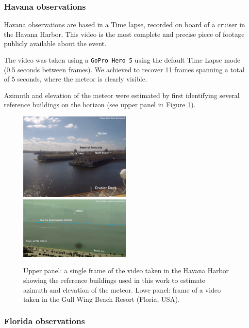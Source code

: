\documentclass[fleqn,usenatbib]{mnras}
\begin{document}
\subsubsection{Havana observations}
\label{sec:havana_observations}

Havana observations are based in a Time lapse, recorded on board of a cruiser in the Havana Harbor.  This video is the most complete and precise piece of footage publicly available about the event.  

The video was taken using a {\tt GoPro Hero 5} using the default Time Lapse mode (0.5 seconds between frames). We achieved to recover 11 frames spanning a total of 5 seconds, where the meteor is clearly visible.  

Azimuth and elevation of the meteor were estimated by first identifying several reference buildings on the horizon (see upper panel in Figure \ref{fig:havana_florida}).

\begin{figure}  
  \centering
  \includegraphics[width=0.50\textwidth]{picture-havana-vp.png}\\
  \includegraphics[width=0.50\textwidth]{picture-florida-vp.png}
\caption{Upper panel: a single frame of the video taken in the Havana Harbor showing the reference buildings used in this work to estimate azimuth and elevation of the meteor. Lowe panel: frame of a video taken in the Gull Wing Beach Resort (Floria, USA).\label{fig:havana_florida}}
\end{figure}

\subsubsection{Florida observations}
\label{sec:florida_observations}
\end{document}
